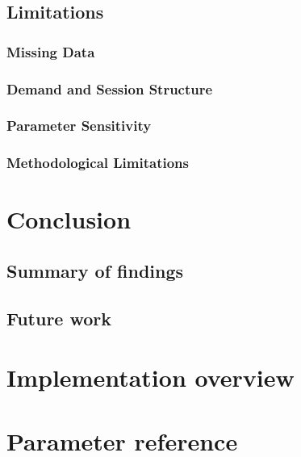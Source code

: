 \documentclass[11pt,a4paper]{article}
\begin{document}
\subsection{Limitations}
\label{sec:eval:limits}

\subsubsection{Missing Data}

\subsubsection{Demand and Session Structure}

\subsubsection{Parameter Sensitivity}

\subsubsection{Methodological Limitations}

\section{Conclusion}
\label{sec:conclusion}

\subsection{Summary of findings}

\subsection{Future work}

\appendix

\section{Implementation overview}
\label{app:impl}

\section{Parameter reference}
\label{app:params}



\end{document}
